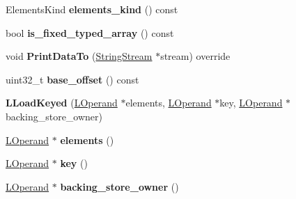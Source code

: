 \begin{DoxyCompactItemize}
\item 
Elements\+Kind {\bfseries elements\+\_\+kind} () const \hypertarget{classv8_1_1internal_1_1_l_load_keyed_a59cb1eff8d46bdb1d5d5c59aec4e9f47}{}\label{classv8_1_1internal_1_1_l_load_keyed_a59cb1eff8d46bdb1d5d5c59aec4e9f47}

\item 
bool {\bfseries is\+\_\+fixed\+\_\+typed\+\_\+array} () const \hypertarget{classv8_1_1internal_1_1_l_load_keyed_a4bfabc8b862c384fa4cf2d12bbeb40b1}{}\label{classv8_1_1internal_1_1_l_load_keyed_a4bfabc8b862c384fa4cf2d12bbeb40b1}

\item 
void {\bfseries Print\+Data\+To} (\hyperlink{classv8_1_1internal_1_1_string_stream}{String\+Stream} $\ast$stream) override\hypertarget{classv8_1_1internal_1_1_l_load_keyed_ab79d974cf88e1e1dbd886b24f0ff1984}{}\label{classv8_1_1internal_1_1_l_load_keyed_ab79d974cf88e1e1dbd886b24f0ff1984}

\item 
uint32\+\_\+t {\bfseries base\+\_\+offset} () const \hypertarget{classv8_1_1internal_1_1_l_load_keyed_a944c93975338d43236e1a696b686f4a4}{}\label{classv8_1_1internal_1_1_l_load_keyed_a944c93975338d43236e1a696b686f4a4}

\item 
{\bfseries L\+Load\+Keyed} (\hyperlink{classv8_1_1internal_1_1_l_operand}{L\+Operand} $\ast$elements, \hyperlink{classv8_1_1internal_1_1_l_operand}{L\+Operand} $\ast$key, \hyperlink{classv8_1_1internal_1_1_l_operand}{L\+Operand} $\ast$backing\+\_\+store\+\_\+owner)\hypertarget{classv8_1_1internal_1_1_l_load_keyed_ad304d9ea6496224e4a11a6cae2ee335b}{}\label{classv8_1_1internal_1_1_l_load_keyed_ad304d9ea6496224e4a11a6cae2ee335b}

\item 
\hyperlink{classv8_1_1internal_1_1_l_operand}{L\+Operand} $\ast$ {\bfseries elements} ()\hypertarget{classv8_1_1internal_1_1_l_load_keyed_a2fdaa6ebcc228ac46d2a03cffd1468ea}{}\label{classv8_1_1internal_1_1_l_load_keyed_a2fdaa6ebcc228ac46d2a03cffd1468ea}

\item 
\hyperlink{classv8_1_1internal_1_1_l_operand}{L\+Operand} $\ast$ {\bfseries key} ()\hypertarget{classv8_1_1internal_1_1_l_load_keyed_aea9caf0333cbad4a04007bd93e0fb176}{}\label{classv8_1_1internal_1_1_l_load_keyed_aea9caf0333cbad4a04007bd93e0fb176}

\item 
\hyperlink{classv8_1_1internal_1_1_l_operand}{L\+Operand} $\ast$ {\bfseries backing\+\_\+store\+\_\+owner} ()\hypertarget{classv8_1_1internal_1_1_l_load_keyed_abaa0161e1ba4f83060c3bdd5bcf52c44}{}\label{classv8_1_1internal_1_1_l_load_keyed_abaa0161e1ba4f83060c3bdd5bcf52c44}


\end{DoxyCompactItemize}

